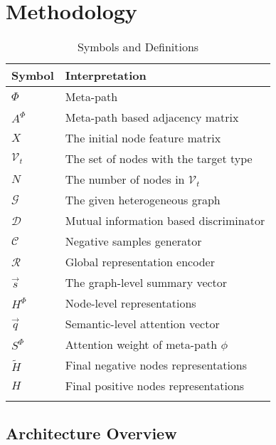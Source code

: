 \documentclass[conference]{IEEEtran}
\begin{document}
\section{{\our} Methodology}
	\label{sec:solution}


	


	
	
\begin{table}[h]
\centering
		\caption{Symbols and Definitions}
\begin{tabular}{ll}
			\toprule
			Symbol & Interpretation  \\
			\midrule
			$\Phi$ & Meta-path\\
			$A^{\Phi}$ & Meta-path based adjacency matrix\\
			$X$ & The initial node feature matrix\\
$\mathcal{V}_t$ & The set of nodes with the target type\\
			$N$ & The number of nodes in $\mathcal{V}_t$\\
			$\mathcal{G}$ & The given heterogeneous graph \\
			$\mathcal{D}$ & Mutual information based discriminator\\
			$\mathcal{C}$ & Negative samples generator\\
			$\mathcal{R}$ &Global representation encoder\\
			$\vec{s}$ & The graph-level summary vector \\
			$H^{\Phi}$ & Node-level representations \\
			$\vec{q}$ & Semantic-level attention vector \\
			$S^{\Phi}$ & Attention weight of meta-path $\phi$\\
			$\tilde{H}$ & Final negative nodes representations \\
			$H$ & Final positive nodes representations \\
			\bottomrule
			\label{tab:notation}
			\vspace{-20pt}
		\end{tabular}
	\end{table}
\subsection{{\our} Architecture Overview}
\end{document}
